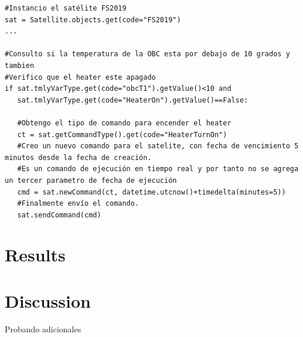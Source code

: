 \documentclass[twoside,twocolumn]{article}
\begin{document}
{{\begin{verbatim}
#Instancio el satélite FS2019
sat = Satellite.objects.get(code="FS2019")
...

#Consulto si la temperatura de la OBC esta por debajo de 10 grados y tambien
#Verifico que el heater este apagado
if sat.tmlyVarType.get(code="obcT1").getValue()<10 and 
   sat.tmlyVarType.get(code="HeaterOn").getValue()==False:
   
   #Obtengo el tipo de comando para encender el heater
   ct = sat.getCommandType().get(code="HeaterTurnOn")
   #Creo un nuevo comando para el satelite, con fecha de vencimiento 5 minutos desde la fecha de creación. 
   #Es un comando de ejecución en tiempo real y por tanto no se agrega un tercer parametro de fecha de ejecución
   cmd = sat.newCommand(ct, datetime.utcnow()+timedelta(minutes=5))
   #Finalmente envío el comando.
   sat.sendCommand(cmd)
\end{verbatim}



\section{Results}




% 



\section{Discussion}	

Probando adicionales	



}}
\end{document}
